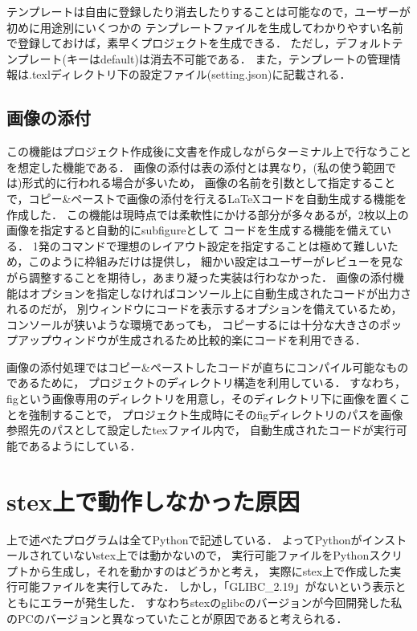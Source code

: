 \documentclass[dvipdfmx]{jsarticle}
\begin{document}
テンプレートは自由に登録したり消去したりすることは可能なので，ユーザーが初めに用途別にいくつかの
テンプレートファイルを生成してわかりやすい名前で登録しておけば，素早くプロジェクトを生成できる．
ただし，デフォルトテンプレート(キーはdefault)は消去不可能である．
また，テンプレートの管理情報は.texlディレクトリ下の設定ファイル(setting.json)に記載される．

\subsection{画像の添付}
この機能はプロジェクト作成後に文書を作成しながらターミナル上で行なうことを想定した機能である．
画像の添付は表の添付とは異なり，(私の使う範囲では)形式的に行われる場合が多いため，
画像の名前を引数として指定することで，コピー\&ペーストで画像の添付を行える\LaTeX コードを自動生成する機能を作成した．
この機能は現時点では柔軟性にかける部分が多々あるが，2枚以上の画像を指定すると自動的にsubfigureとして
コードを生成する機能を備えている．
1発のコマンドで理想のレイアウト設定を指定することは極めて難しいため，このように枠組みだけは提供し，
細かい設定はユーザーがレビューを見ながら調整することを期待し，あまり凝った実装は行わなかった．
画像の添付機能はオプションを指定しなければコンソール上に自動生成されたコードが出力されるのだが，
別ウィンドウにコードを表示するオプションを備えているため，コンソールが狭いような環境であっても，
コピーするには十分な大きさのポップアップウィンドウが生成されるため比較的楽にコードを利用できる．

画像の添付処理ではコピー\&ペーストしたコードが直ちにコンパイル可能なものであるために，
プロジェクトのディレクトリ構造を利用している．
すなわち，figという画像専用のディレクトリを用意し，そのディレクトリ下に画像を置くことを強制することで，
プロジェクト生成時にそのfigディレクトリのパスを画像参照先のパスとして設定したtexファイル内で，
自動生成されたコードが実行可能であるようにしている．

\section{stex上で動作しなかった原因}
上で述べたプログラムは全てPythonで記述している．
よってPythonがインストールされていないstex上では動かないので，
実行可能ファイルをPythonスクリプトから生成し，それを動かすのはどうかと考え，
実際にstex上で作成した実行可能ファイルを実行してみた．
しかし，「GLIBC\_2.19」がないという表示とともにエラーが発生した．
すなわちstexのglibcのバージョンが今回開発した私のPCのバージョンと異なっていたことが原因であると考えられる．
\end{document}
